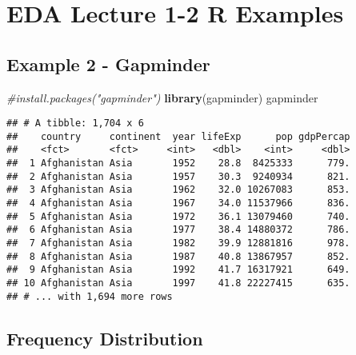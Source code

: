 \documentclass[
]{book}
\newenvironment{Shaded}{\begin{snugshade}}{\end{snugshade}}
\newcommand{\CommentTok}[1]{\textcolor[rgb]{0.56,0.35,0.01}{\textit{#1}}}
\newcommand{\KeywordTok}[1]{\textcolor[rgb]{0.13,0.29,0.53}{\textbf{#1}}}
\newcommand{\NormalTok}[1]{#1}
\newcommand{\OperatorTok}[1]{\textcolor[rgb]{0.81,0.36,0.00}{\textbf{#1}}}
\begin{document}
\hypertarget{eda-lecture-1-2-r-examples}{%
\chapter{EDA Lecture 1-2 R Examples}\label{eda-lecture-1-2-r-examples}}

\hypertarget{example-2---gapminder}{%
\section{Example 2 - Gapminder}\label{example-2---gapminder}}

\begin{Shaded}
\begin{Highlighting}[]
\CommentTok{#install.packages("gapminder")}
\KeywordTok{library}\NormalTok{(gapminder)}
\NormalTok{gapminder}
\end{Highlighting}
\end{Shaded}

\begin{verbatim}
## # A tibble: 1,704 x 6
##    country     continent  year lifeExp      pop gdpPercap
##    <fct>       <fct>     <int>   <dbl>    <int>     <dbl>
##  1 Afghanistan Asia       1952    28.8  8425333      779.
##  2 Afghanistan Asia       1957    30.3  9240934      821.
##  3 Afghanistan Asia       1962    32.0 10267083      853.
##  4 Afghanistan Asia       1967    34.0 11537966      836.
##  5 Afghanistan Asia       1972    36.1 13079460      740.
##  6 Afghanistan Asia       1977    38.4 14880372      786.
##  7 Afghanistan Asia       1982    39.9 12881816      978.
##  8 Afghanistan Asia       1987    40.8 13867957      852.
##  9 Afghanistan Asia       1992    41.7 16317921      649.
## 10 Afghanistan Asia       1997    41.8 22227415      635.
## # ... with 1,694 more rows
\end{verbatim}

\pagebreak

\hypertarget{frequency-distribution}{%
\section{Frequency Distribution}\label{frequency-distribution}}

\begin{Shaded}
\end{Shaded}
\end{document}
